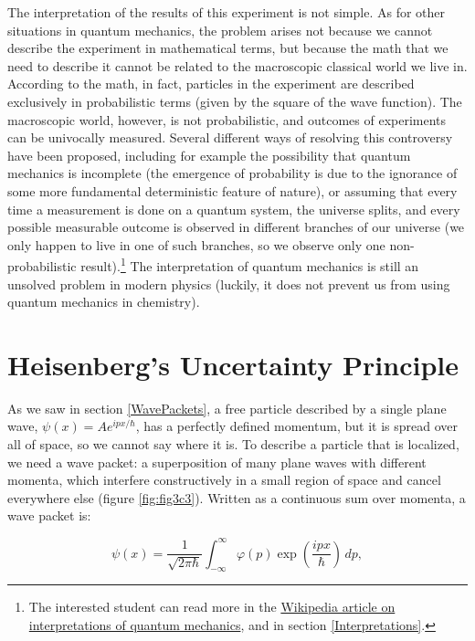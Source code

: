 \documentclass[
  english,
  9pt,
]{extbook}
\theoremstyle{definition}
\theoremstyle{definition}
\theoremstyle{definition}
\theoremstyle{definition}
\theoremstyle{remark}
\begin{document}
The interpretation of the results of this experiment is not simple. As for other situations in quantum mechanics, the problem arises not because we cannot describe the experiment in mathematical terms, but because the math that we need to describe it cannot be related to the macroscopic classical world we live in. According to the math, in fact, particles in the experiment are described exclusively in probabilistic terms (given by the square of the wave function). The macroscopic world, however, is not probabilistic, and outcomes of experiments can be univocally measured. Several different ways of resolving this controversy have been proposed, including for example the possibility that quantum mechanics is incomplete (the emergence of probability is due to the ignorance of some more fundamental deterministic feature of nature), or assuming that every time a measurement is done on a quantum system, the universe splits, and every possible measurable outcome is observed in different branches of our universe (we only happen to live in one of such branches, so we observe only one non-probabilistic result).\footnote{The interested student can read more in the \href{https://en.wikipedia.org/wiki/Interpretations_of_quantum_mechanics}{Wikipedia article on interpretations of quantum mechanics}, and in section \ref{Interpretations}.} The interpretation of quantum mechanics is still an unsolved problem in modern physics (luckily, it does not prevent us from using quantum mechanics in chemistry).

\section{Heisenberg's Uncertainty Principle}\label{heisenbergs-uncertainty-principle}

As we saw in section \ref{WavePackets}, a free particle described by a single plane wave, \(\psi(x)=Ae^{ipx/\hbar}\), has a perfectly defined momentum, but it is spread over all of space, so we cannot say where it is. To describe a particle that is localized, we need a wave packet: a superposition of many plane waves with different momenta, which interfere constructively in a small region of space and cancel everywhere else (figure \ref{fig:fig3c3}). Written as a continuous sum over momenta, a wave packet is:

\begin{equation}
\psi (x)=\frac {1}{\sqrt{2\pi\hbar}}\int_{-\infty }^{\infty }\varphi (p) \exp
\left(\frac{ip x}{\hbar} \right)\,dp,
\label{eq:heis2}  
\end{equation}
\end{document}
